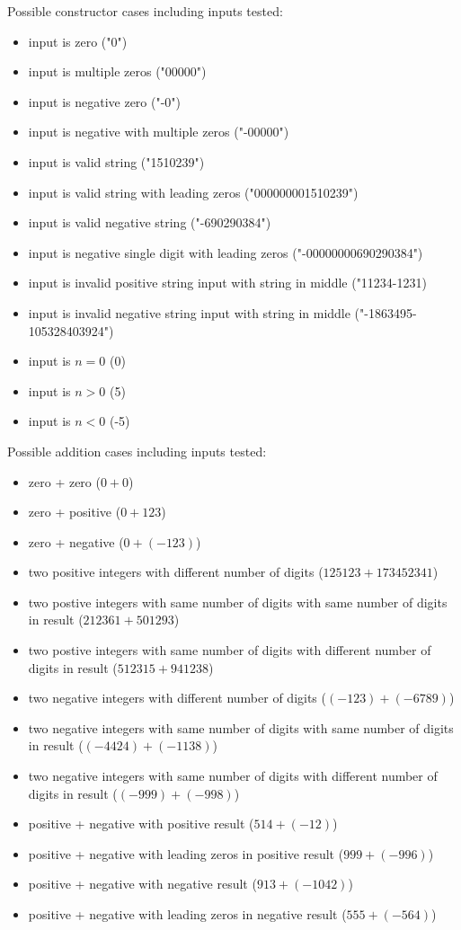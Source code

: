 \documentclass[12pt]{article}
\begin{document}
Possible constructor cases including inputs tested: 
\begin{itemize}
    \item input is zero ("0")
    \item input is multiple zeros ("00000")
    \item input is negative zero ("-0")
    \item input is negative with multiple zeros ("-00000")
    \item input is valid string ("1510239")
    \item input is valid string with leading zeros ("000000001510239")
    \item input is valid negative string ("-690290384")
    \item input is negative single digit with leading zeros ("-00000000690290384")
    \item input is invalid positive string input with string in middle ("11234-1231) 
    \item input is invalid negative string input with string in middle ("-1863495-105328403924")
    \item input is $n = 0$ (0)
    \item input is $n > 0$ (5)
    \item input is $n < 0$ (-5)
\end{itemize}
Possible addition cases including inputs tested:
\begin{itemize}
    \item zero + zero ($0 + 0$)
    \item zero + positive ($0 + 123$)
    \item zero + negative ($0 + (-123)$)
    \item two positive integers with different number of digits ($125123 + 173452341$)
    \item two postive integers with same number of digits with same number of digits in result ($212361 + 501293$) 
    \item two postive integers with same number of digits with different number of digits in result ($512315 + 941238$) 
    \item two negative integers with different number of digits ($(-123) + (-6789)$)
    \item two negative integers with same number of digits with same number of digits in result ($(-4424) + (-1138)$) 
    \item two negative integers with same number of digits with different number of digits in result ($(-999) + (-998)$)
    \item positive + negative with positive result ($514 + (-12)$) 
    \item positive + negative with leading zeros in positive result ($999 + (-996)$)
    \item positive + negative with negative result ($913 + (-1042)$) 
    \item positive + negative with leading zeros in negative result ($555 + (-564)$)
\end{itemize}
\end{document}
